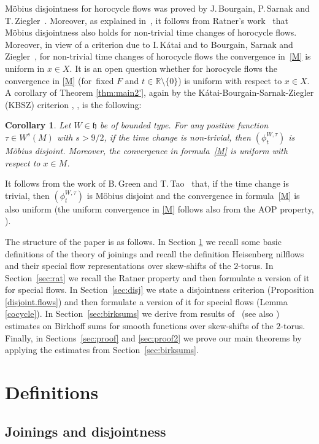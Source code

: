 \documentclass[10pt]{amsart}
\theoremstyle{definition}
\theoremstyle{plain}
\newtheorem{corollary}[definition]{Corollary}
\newcommand\RR{\mathbb{R}}
\begin{document}
Möbius disjointness for horocycle flows was proved by J.\,Bourgain, P.\,Sarnak and T.\,Ziegler~\cite{BSZ}. Moreover, as explained in~\cite{FlaFo2}, it follows from Ratner's work~\cite{Rat2} that Möbius disjointness also holds for non-trivial time changes of horocycle flows. Moreover, in view of a criterion due to I.\,Kátai \cite{K} and to Bourgain, Sarnak and Ziegler~\cite{BSZ}, for non-trivial time changes of horocycle flows the convergence in~\eqref{M} is uniform in $x\in X$. It is an open question whether for horocycle flows the convergence in \eqref{M} (for~fixed $F$ and $t\in \RR\setminus \{0\}$) is uniform with respect to $x\in X$. A corollary of Theorem \ref{thm:main2'}, again by the Kátai-Bourgain-Sarnak-Ziegler (KBSZ) criterion \cite{K}, \cite{BSZ}, is the following:
\begin{corollary} Let $W\in \mathfrak h$ be of bounded type. For any positive function $\tau\in W^s(M)$ with $s>9/2$, if the time change is non-trivial, then $(\phi_t^{W,\tau})$ is Möbius disjoint. Moreover, the convergence in formula~\eqref{M} is uniform with respect to $x\in M$.
\end{corollary}
It follows from the work of B.\,Green and T.\,Tao~\cite{GT} that, if the time change is trivial, then $(\phi_t^{W,\tau})$ is Möbius
disjoint and the convergence in formula~\eqref{M} is also uniform (the uniform convergence in \eqref{M} follows also from the AOP property, \cite{FFKL}).

The structure of the paper is as follows. In Section \ref{sec.def} we recall some basic definitions of the theory of
joinings and recall the definition Heisenberg nilflows and their special flow representations over skew-shifts of the $2$-torus. In Section~\ref{sec:rat} we recall the Ratner property and then formulate a version of it for special flows. In Section~\ref{sec:disj} we state a disjointness criterion (Proposition \ref{disjoint.flows}) and then formulate a version of it for special flows (Lemma \ref{cocycle}). In Section~\ref{sec:birksums} we derive from results of~\cite{FlaFo1} (see also \cite{FoSurvey}) estimates on Birkhoff sums for smooth functions over skew-shifts of the $2$-torus. Finally, in Sections~\ref{sec:proof} and \ref{sec:proof2} we prove our main theorems by applying the estimates from Section~\ref{sec:birksums}.

\section{Definitions}\label{sec.def}
\subsection{Joinings and disjointness}\label{sec.dis}
\end{document}
